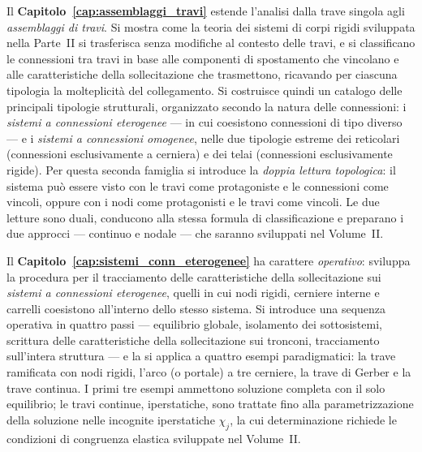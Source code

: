 Il \textbf{Capitolo~\ref{cap:assemblaggi_travi}} estende l'analisi dalla trave singola
agli \emph{assemblaggi di travi}. Si mostra come la teoria dei sistemi di corpi rigidi
sviluppata nella Parte~II si trasferisca senza modifiche al contesto delle travi, e si
classificano le connessioni tra travi in base alle componenti di spostamento che
vincolano e alle caratteristiche della sollecitazione che trasmettono, ricavando per
ciascuna tipologia la molteplicità del collegamento. Si costruisce quindi un catalogo
delle principali tipologie strutturali, organizzato secondo la natura delle connessioni:
i \emph{sistemi a connessioni eterogenee} --- in cui coesistono connessioni di tipo
diverso --- e i \emph{sistemi a connessioni omogenee}, nelle due tipologie estreme dei
reticolari (connessioni esclusivamente a cerniera) e dei telai (connessioni
esclusivamente rigide). Per questa seconda famiglia si introduce la
\emph{doppia lettura topologica}: il sistema può essere visto con le travi come
protagoniste e le connessioni come vincoli, oppure con i nodi come protagonisti e
le travi come vincoli. Le due letture sono duali, conducono alla stessa formula di
classificazione e preparano i due approcci --- continuo e nodale --- che saranno
sviluppati nel Volume~II.

Il \textbf{Capitolo~\ref{cap:sistemi_conn_eterogenee}} ha carattere \emph{operativo}:
sviluppa la procedura per il tracciamento delle caratteristiche della sollecitazione
sui \emph{sistemi a connessioni eterogenee}, quelli in cui nodi rigidi, cerniere
interne e carrelli coesistono all'interno dello stesso sistema. Si introduce una
sequenza operativa in quattro passi --- equilibrio globale, isolamento dei
sottosistemi, scrittura delle caratteristiche della sollecitazione sui tronconi,
tracciamento sull'intera struttura --- e la si applica a quattro esempi paradigmatici:
la trave ramificata con nodi rigidi, l'arco (o portale) a tre cerniere, la trave di Gerber e la trave
continua. I primi tre esempi ammettono soluzione completa con il
solo equilibrio; le travi continue, iperstatiche, sono trattate fino alla
parametrizzazione della soluzione nelle incognite iperstatiche $\chi_j$, la cui
determinazione richiede le condizioni di congruenza elastica sviluppate nel Volume~II.

